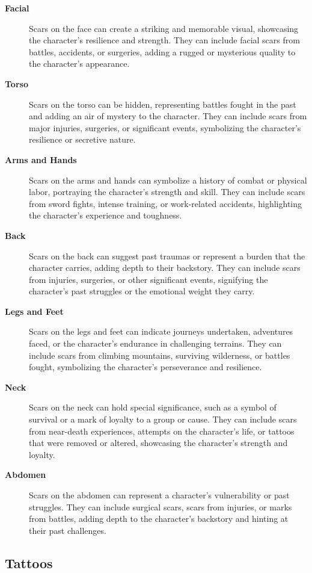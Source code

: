 \begin{description}
    \item[\textbf{Facial}] Scars on the face can create a striking and memorable visual, showcasing the character's resilience and strength. They can include facial scars from battles, accidents, or surgeries, adding a rugged or mysterious quality to the character's appearance.
    \item[\textbf{Torso}] Scars on the torso can be hidden, representing battles fought in the past and adding an air of mystery to the character. They can include scars from major injuries, surgeries, or significant events, symbolizing the character's resilience or secretive nature.
    \item[\textbf{Arms and Hands}] Scars on the arms and hands can symbolize a history of combat or physical labor, portraying the character's strength and skill. They can include scars from sword fights, intense training, or work-related accidents, highlighting the character's experience and toughness.
    \item[\textbf{Back}] Scars on the back can suggest past traumas or represent a burden that the character carries, adding depth to their backstory. They can include scars from injuries, surgeries, or other significant events, signifying the character's past struggles or the emotional weight they carry.
    \item[\textbf{Legs and Feet}] Scars on the legs and feet can indicate journeys undertaken, adventures faced, or the character's endurance in challenging terrains. They can include scars from climbing mountains, surviving wilderness, or battles fought, symbolizing the character's perseverance and resilience.
    \item[\textbf{Neck}] Scars on the neck can hold special significance, such as a symbol of survival or a mark of loyalty to a group or cause. They can include scars from near-death experiences, attempts on the character's life, or tattoos that were removed or altered, showcasing the character's strength and loyalty.
    \item[\textbf{Abdomen}] Scars on the abdomen can represent a character's vulnerability or past struggles. They can include surgical scars, scars from injuries, or marks from battles, adding depth to the character's backstory and hinting at their past challenges.
\end{description}

\subsection{\textbf{Tattoos}}

